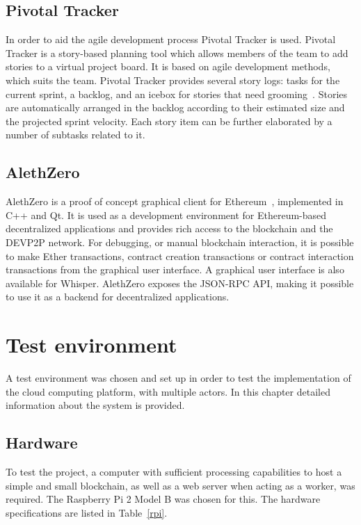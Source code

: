 \subsection{Pivotal Tracker}
In order to aid the agile development process Pivotal Tracker is used. Pivotal Tracker is a story-based planning tool which allows members of the team to add stories to a virtual project board. It is based on agile development methods, which suits the team. Pivotal Tracker provides several story logs: tasks for the current sprint, a backlog, and an icebox for stories that need grooming~\cite{pivotaltracker}. Stories are automatically arranged in the backlog according to their estimated size and the projected sprint velocity. Each story item can be further elaborated by a number of subtasks related to it. 

\subsection{AlethZero}
AlethZero is a proof of concept graphical client for Ethereum~\cite{github-alethzero}, implemented in C++ and Qt. It is used as a development environment for Ethereum-based decentralized applications and provides rich access to the blockchain and the DEVP2P network. For debugging, or manual blockchain interaction, it is possible to make Ether transactions, contract creation transactions or contract interaction transactions from the graphical user interface. A graphical user interface is also available for Whisper. AlethZero exposes the JSON-RPC API, making it possible to use it as a backend for decentralized applications.

\section{Test environment}
A test environment was chosen and set up in order to test the implementation of the cloud computing platform, with multiple actors. In this chapter detailed information about the system is provided.

\subsection{Hardware}
To test the project, a computer with sufficient processing capabilities to host a simple and small blockchain, as well as a web server when acting as a worker, was required. The Raspberry Pi 2 Model B was chosen for this. The hardware specifications are listed in Table~\ref{rpi}.

